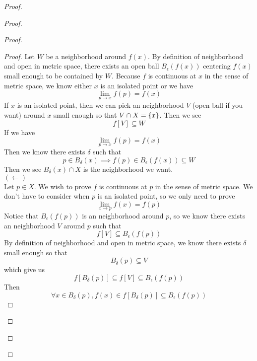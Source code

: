 \documentclass{report}
\begin{document}
\begin{proof}
\begin{proof}
\begin{proof}
\begin{proof}
Let $W$ be a neighborhood around  $f(x)$. By definition of neighborhood and open in metric space, there exists  an open ball $B_{\epsilon }(f(x))$ centering $f(x)$ small enough to be contained by $W$. Because $f$ is continuous at  $x$ in the sense of metric space, we know either $x$ is an isolated point or we have 
\begin{equation*}
\lim_{p\to x}f(p)=f(x)
\end{equation*}
If $x$ is an isolated point, then we can pick an neighborhood $V$ (open ball if you want) around $x$  small enough so that $V\cap X=\{ x \}$. Then we see 
\begin{equation*}
f[V]\subseteq W
\end{equation*}
If we have 
\begin{equation*}
\lim_{p\to x}f(p)=f(x)
\end{equation*}
Then we know there exists $\delta$ such that 
\begin{equation*}
p\in B_{\delta}(x)\implies f(p)\in B_{\epsilon }(f(x))\subseteq W
\end{equation*}
Then we see $B_{\delta}(x)\cap X$ is the neighborhood we want.\\

$(\longleftarrow)$\\

Let $p\in  X$. We wish to prove $f$ is continuous at $p$ in the sense of metric space. We don't have to consider when $p$ is an isolated point, so we only need to prove
\begin{equation*}
\lim_{x\to p}f(x)=f(p)
\end{equation*}
Notice that $B_{\epsilon }(f(p))$ is an neighborhood around $p$, so we know there exists an neighborhood $V$ around $p$ such that 
\begin{equation*}
f[V]\subseteq B_{\epsilon }(f(p))
\end{equation*}
By definition of neighborhood and open in metric space, we know there exists $\delta$ small enough so that 
\begin{equation*}
B_{\delta}(p)\subseteq V
\end{equation*}
which give us
\begin{equation*}
f[B_{\delta}(p)]\subseteq f[V]\subseteq B_{\epsilon }(f(p))
\end{equation*}
Then 
\begin{equation*}
\forall x\in B_{\delta}(p), f(x)\in f[B_{\delta}(p)]\subseteq B_{\epsilon }(f(p))
\end{equation*}
\end{proof}

\end{proof}
\end{proof}
\end{proof}
\end{document}
